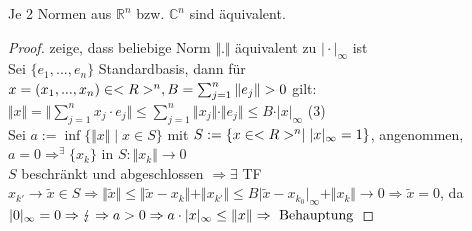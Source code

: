 \begin{proposition}
	Je 2 Normen aus $\mathbb{R}^n$ bzw. $\mathbb{C}^n$ sind äquivalent.
\end{proposition}
\begin{proof}
	zeige, dass beliebige Norm $\Vert.\Vert$ äquivalent zu $\vert\cdot\vert_\infty$ ist \\
	Sei $\{e_1,...,e_n\}$ Standardbasis, dann für $x=(x_1,...,x_n)\in <R>^n, B=\sum_{j=1}^{n} \Vert e_j\Vert>0$ gilt: $\Vert x\Vert=\Vert\sum_{j=1}^n x_j\cdot e_j\Vert\le \sum_{j=1}^n \Vert x_j\Vert\cdot\Vert e_j\Vert\le B\cdot\vert x\vert_\infty$ (3) \\
	Sei $a:=\inf\{\Vert x\Vert\mid x\in S\}$ mit $S:=\{x\in <R>^n\mid \vert x\vert_\infty=1\}$, angenommen, $a=0\Rightarrow^\exists \{x_k\}$ in $S:\Vert x_k\Vert\to 0$ \\
	$S$ beschränkt und abgeschlossen $\Rightarrow\exists$ TF $x_{k'}\to\tilde{x}\in S\Rightarrow \Vert\tilde{x}\Vert\le \Vert\tilde{x}-x_k\Vert+\Vert x_{k'}\Vert\le B\vert \tilde{x}-x_{k_0}\vert_\infty + \Vert x_k\Vert\to 0\Rightarrow \tilde{x}=0$, da $\vert 0\vert_\infty=0\Rightarrow\lightning\Rightarrow a>0\Rightarrow a\cdot\vert x\vert_\infty\le \Vert x\Vert\Rightarrow \text{ Behauptung}$
\end{proof}
